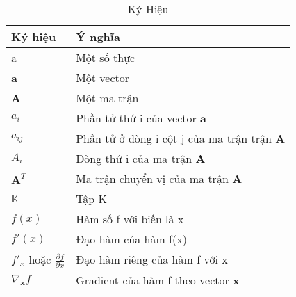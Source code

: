 \begin{table}[]

\caption{Ký Hiệu}
\label{my-label}
\renewcommand{\arraystretch}{2}
\hspace*{20mm}
\begin{tabular}{p{3cm} p{10cm} }
Ký hiệu & Ý nghĩa\\
\hline
a                                            & Một số thực                                          \\
\textbf{a}                                   & Một vector                                           \\
\textbf{A}                                   & Một ma trận                                          \\
$a_{i}$                                      & Phần tử thứ i của vector $\textbf{a}$                \\
$a_{ij}$                                     & Phần tử ở dòng i cột j của ma trận trận $\textbf{A}$ \\
$A_{i}$                                      & Dòng thứ i của ma trận $\textbf{A}$                  \\
$\textbf{A}^T$ & Ma trận chuyển vị của ma trận $\textbf{A}$           \\
$\mathbb{K}$                                 & Tập K                                                \\
$f(x)$                                       & Hàm số f với biến là x                               \\
$f'(x)$                              & Đạo hàm của hàm f(x)                                 \\
$\displaystyle f'_{x} $ hoặc $\displaystyle \frac{\partial f}{\partial x} $ & Đạo hàm riêng của  hàm f với x                       \\
$\nabla_\textbf{x}f$ & Gradient của hàm f theo vector \textbf{x}   \\

\end{tabular}
\end{table}


